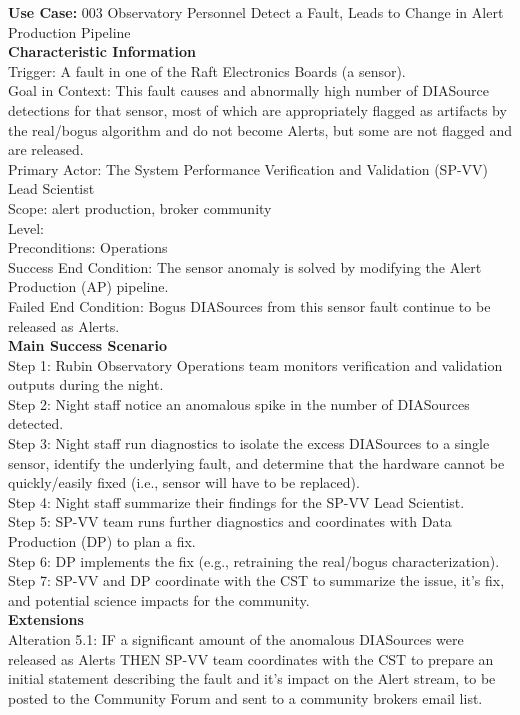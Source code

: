 {\bf Use Case:} 003 Observatory Personnel Detect a Fault, Leads to Change in Alert Production Pipeline \\

{\bf Characteristic Information} \\
Trigger: A fault in one of the Raft Electronics Boards (a sensor). \\
Goal in Context: This fault causes and abnormally high number of DIASource detections for that sensor, most of which are appropriately flagged as artifacts by the real/bogus algorithm and do not become Alerts, but some are not flagged and are released. \\
Primary Actor: The System Performance Verification and Validation (SP-VV) Lead Scientist \\
Scope: alert production, broker community \\
Level: \\
Preconditions: Operations \\
Success End Condition: The sensor anomaly is solved by modifying the Alert Production (AP) pipeline. \\
Failed End Condition: Bogus DIASources from this sensor fault continue to be released as Alerts. \\

{\bf Main Success Scenario} \\
Step 1: Rubin Observatory Operations team monitors verification and validation outputs during the night. \\
Step 2: Night staff notice an anomalous spike in the number of DIASources detected. \\
Step 3: Night staff run diagnostics to isolate the excess DIASources to a single sensor, identify the underlying fault, and determine that the hardware cannot be quickly/easily fixed (i.e., sensor will have to be replaced). \\
Step 4: Night staff summarize their findings for the SP-VV Lead Scientist. \\
Step 5: SP-VV team runs further diagnostics and coordinates with Data Production (DP) to plan a fix. \\
Step 6: DP implements the fix (e.g., retraining the real/bogus characterization). \\
Step 7: SP-VV and DP coordinate with the CST to summarize the issue, it's fix, and potential science impacts for the community. \\

{\bf Extensions} \\
Alteration 5.1: IF a significant amount of the anomalous DIASources were released as Alerts THEN SP-VV team coordinates with the CST to prepare an initial statement describing the fault and it's impact on the Alert stream, to be posted to the Community Forum and sent to a community brokers email list. \\


